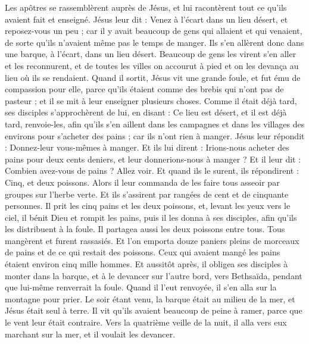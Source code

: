 \begin{multicols}{2}
Les apôtres se rassemblèrent auprès de Jésus, et lui racontèrent tout ce qu'ils avaient fait et enseigné.
Jésus leur dit : Venez à l'écart dans un lieu désert, et reposez-vous un peu ; car il y avait beaucoup de gens qui allaient et qui venaient, de sorte qu'ils n'avaient même pas le temps de manger.
Ils s'en allèrent donc dans une barque, à l’écart, dans un lieu désert.
Beaucoup de gens les virent s’en aller et les reconnurent, et de toutes les villes on accourut à pied et on les devança au lieu où ils se rendaient.
Quand il sortit, Jésus vit une grande foule, et fut ému de compassion pour elle, parce qu’ils étaient comme des brebis qui n'ont pas de pasteur ; et il se mit à leur enseigner plusieurs choses.
Comme il était déjà tard, ses disciples s'approchèrent de lui, en disant : Ce lieu est désert, et il est déjà tard,
renvoie-les, afin qu’ils s'en aillent dans les campagnes et dans les villages des environs pour s’acheter des pains ; car ils n'ont rien à manger.
Jésus leur répondit : Donnez-leur vous-mêmes à manger. Et ils lui dirent : Irions-nous acheter des pains pour deux cents deniers, et leur donnerions-nous à manger ?
Et il leur dit : Combien avez-vous de pains ? Allez voir. Et quand ils le surent, ils répondirent : Cinq, et deux poissons.
Alors il leur commanda de les faire tous asseoir par groupes sur l'herbe verte.
Et ils s'assirent par rangées de cent et de cinquante personnes.
Il prit les cinq pains et les deux poissons, et, levant les yeux vers le ciel, il bénit Dieu et rompit les pains, puis il les donna à ses disciples, afin qu'ils les distribuent à la foule. Il partagea aussi les deux poissons entre tous.
Tous mangèrent et furent rassasiés.
Et l’on emporta douze paniers pleins de morceaux de pains et de ce qui restait des poissons.
Ceux qui avaient mangé les pains étaient environ cinq mille hommes.
Et aussitôt après, il obligea ses disciples à monter dans la barque, et à le devancer sur l’autre bord, vers Bethsaïda, pendant que lui-même renverrait la foule.
Quand il l’eut renvoyée, il s'en alla sur la montagne pour prier.
Le soir étant venu, la barque était au milieu de la mer, et Jésus était seul à terre.
Il vit qu'ils avaient beaucoup de peine à ramer, parce que le vent leur était contraire. Vers la quatrième veille de la nuit, il alla vers eux marchant sur la mer, et il voulait les devancer.

\end{multicols}
